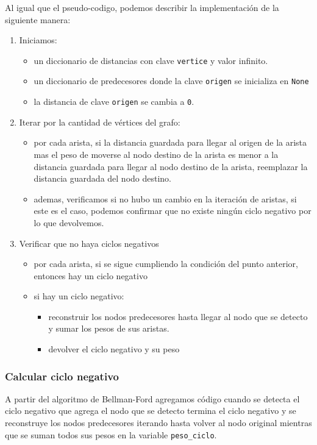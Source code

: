 \documentclass[titlepage,a4paper]{article}
\begin{document}
Al igual que el pseudo-codigo, podemos describir la implementación de la
siguiente manera:

\begin{enumerate}
\item Iniciamos:
\begin{itemize}
\item un diccionario de distancias con clave \texttt{vertice} y valor infinito.
\item un diccionario de predecesores donde la clave \texttt{origen} se inicializa en \texttt{None}
\item la distancia de clave \texttt{origen} se cambia a \texttt{0}.
\end{itemize}
\item Iterar por la cantidad de vértices del grafo:
\begin{itemize}
\item por cada arista, si la distancia guardada para llegar al origen de la
arista mas el peso de moverse al nodo destino de la arista es menor a la
distancia guardada para llegar al nodo destino de la arista, reemplazar la
distancia guardada del nodo destino.
\item ademas, verificamos si no hubo un cambio en la iteración de aristas, si
este es el caso, podemos confirmar que no existe ningún ciclo negativo
por lo que devolvemos.
\end{itemize}
\item Verificar que no haya ciclos negativos
\begin{itemize}
\item por cada arista, si se sigue cumpliendo la condición del punto anterior,
entonces hay un ciclo negativo
\item si hay un ciclo negativo:
\begin{itemize}
\item reconstruir los nodos predecesores hasta llegar al nodo que se detecto
y sumar los pesos de sus aristas.
\item devolver el ciclo negativo y su peso
\end{itemize}
\end{itemize}
\end{enumerate}

\subsubsection{Calcular ciclo negativo}
\label{sec:orgf57bd3c}

A partir del algoritmo de Bellman-Ford agregamos código cuando se detecta el
ciclo negativo que agrega el nodo que se detecto termina el ciclo negativo y se
reconstruye los nodos predecesores iterando hasta volver al nodo original
mientras que se suman todos sus pesos en la variable \texttt{peso\_ciclo}.
\end{document}
